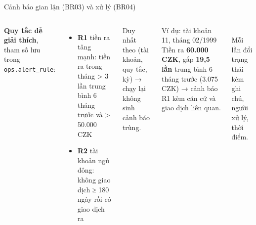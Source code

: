 \documentclass[aspectratio=169,11pt]{beamer}
\newcommand{\tbl}[1]{\texttt{#1}}
\begin{document}
\begin{frame}{Cảnh báo gian lận (BR03) và xử lý (BR04)}
  \begin{columns}[T]
    \small
    \textbf{Quy tắc dễ giải thích}, tham số lưu trong \tbl{ops.alert\_rule}:
    \begin{itemize}
      \item \textbf{R1} tiền ra tăng mạnh: tiền ra trong tháng > 3 lần trung bình 6 tháng trước và > 50.000 CZK
      \item \textbf{R2} tài khoản ngủ đông: không giao dịch ≥ 180 ngày rồi có giao dịch ra
    \end{itemize}
    Duy nhất theo (tài khoản, quy tắc, kỳ) → chạy lại không sinh cảnh báo trùng.
    \begin{block}{Ví dụ: tài khoản 11, tháng 02/1999}
      \small Tiền ra \textbf{60.000 CZK}, gấp \textbf{19,5 lần} trung bình 6 tháng trước (3.075 CZK) → cảnh báo R1 kèm căn cứ và giao dịch liên quan.
    \end{block}
    \medskip
    \centering
    \\
    \footnotesize Mỗi lần đổi trạng thái kèm ghi chú, người xử lý, thời điểm.
  \end{columns}
\end{frame}
\end{document}
